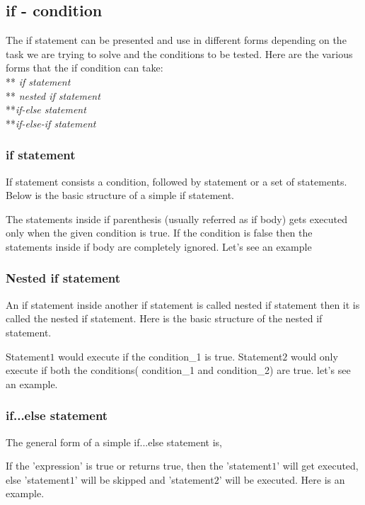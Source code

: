 \documentclass[11pt, a4paper]{article}
\begin{document}
\subsection{if - condition}
The if statement can be presented and use in different forms depending on the task we are trying to solve
and the conditions to be tested. Here are the various forms that the if condition can take:\\
** \textit{if statement}\\ ** \textit{nested if statement}\\ **\textit{if-else statement}\\
**\textit{if-else-if statement}

\subsubsection{if statement}
If statement consists a condition, followed by statement or a set of statements. Below is the basic structure
of a simple if statement.

The statements inside if parenthesis (usually referred as if body) gets executed only when
the given condition is true. If the condition is false then the statements inside if body
are completely ignored. Let's see an example


\subsubsection{Nested if statement}
An if statement inside another if statement is called nested if statement then it is called
the nested if statement. Here is the basic structure of the nested if statement.

Statement$1$ would execute if the condition\_1 is true. Statement$2$ would only execute
if both the conditions( condition\_1 and condition\_2) are true. let's see an example.


\subsubsection{if...else statement}
The general form of a simple if...else statement is,

If the 'expression' is true or returns true, then the 'statement$1$' will get executed,
else 'statement$1$' will be skipped and 'statement$2$' will be executed. Here is an example.

\end{document}
